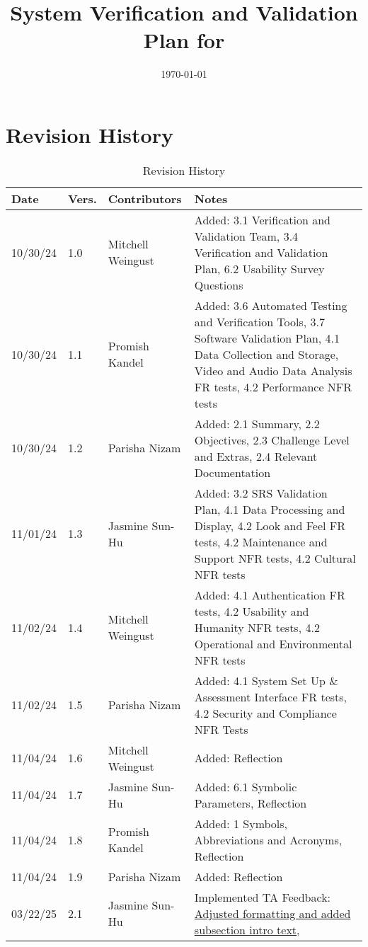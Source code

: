 \documentclass[12pt, titlepage]{article}
\begin{document}
\title{System Verification and Validation Plan for \progname{}} 
\author{\authname}
\date{\today}
	
\maketitle


\section*{Revision History}

\begin{table}[hp]
  \caption{Revision History} \label{TblRevisionHistory}
  \begin{tabularx}{\textwidth}{p{1.5cm}p{1cm}p{3.5cm}X}
  \toprule {\textbf{Date}} & {\textbf{Vers.}} & {\textbf{Contributors}} & {\textbf{Notes}}\\
  \midrule
  10/30/24 & 1.0 & Mitchell Weingust & Added: 3.1 Verification and Validation Team, 3.4 Verification and Validation Plan, 6.2 Usability Survey Questions \\
  10/30/24 & 1.1 & Promish Kandel & Added: 3.6 Automated Testing and Verification Tools, 3.7 Software Validation Plan, 4.1 Data Collection and Storage, Video and Audio Data Analysis FR tests, 4.2 Performance NFR tests \\
  10/30/24 & 1.2 & Parisha Nizam & Added: 2.1 Summary, 2.2 Objectives, 2.3 Challenge Level and Extras, 2.4 Relevant Documentation \\
  11/01/24 & 1.3 & Jasmine Sun-Hu & Added: 3.2 SRS Validation Plan, 4.1 Data Processing and Display, 4.2 Look and Feel FR tests, 4.2 Maintenance and Support NFR tests, 4.2 Cultural NFR tests \\
  11/02/24 & 1.4 & Mitchell Weingust & Added: 4.1 Authentication FR tests, 4.2 Usability and Humanity NFR tests, 4.2 Operational and Environmental NFR tests \\
  11/02/24 & 1.5 & Parisha Nizam & Added: 4.1 System Set Up \& Assessment Interface FR tests, 4.2 Security and Compliance NFR Tests \\
  11/04/24 & 1.6 & Mitchell Weingust & Added: Reflection \\
  11/04/24 & 1.7 & Jasmine Sun-Hu & Added: 6.1 Symbolic Parameters, Reflection \\
  11/04/24 & 1.8 & Promish Kandel & Added: 1 Symbols, Abbreviations and Acronyms, Reflection \\
  11/04/24 & 1.9 & Parisha Nizam & Added: Reflection \\
  03/22/25 & 2.1 & Jasmine Sun-Hu & Implemented TA Feedback: \href{https://github.com/parishanizam/TeleHealth/issues/292}{Adjusted formatting and added subsection intro text}, \\
  \bottomrule
  \end{tabularx}
\end{table}
\end{document}
